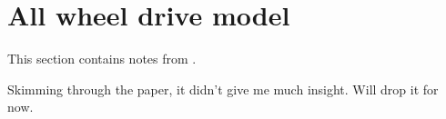 \section{All wheel drive model}


This section contains notes from \cite{efimov}.

Skimming through the paper, it didn't give me much insight. Will drop it for now.
